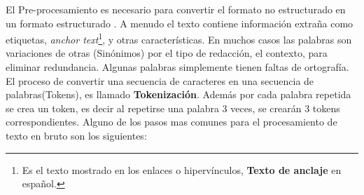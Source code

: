 El Pre-procesamiento es necesario para convertir el formato no estructurado en un formato estructurado \citep{CD1}.
A menudo el texto contiene información extraña como etiquetas, \textit{anchor text}\footnote{Es el texto mostrado en los enlaces o hipervínculos, \textbf{Texto de anclaje} en español.}, y otras características. En muchos casos las palabras son variaciones de otras (Sinónimos) por el tipo de redacción, el contexto, para eliminar redundancia. Algunas palabras simplemente tienen faltas de ortografía. El proceso de convertir una secuencia de caracteres en una secuencia de palabras(Tokens), es llamado \textbf{Tokenización}. Además por cada palabra repetida se crea un token, es decir al repetirse una palabra 3 veces, se crearán 3 tokens correspondientes. Alguno de los pasos mas comunes para el procesamiento de texto en bruto son los siguientes: 

